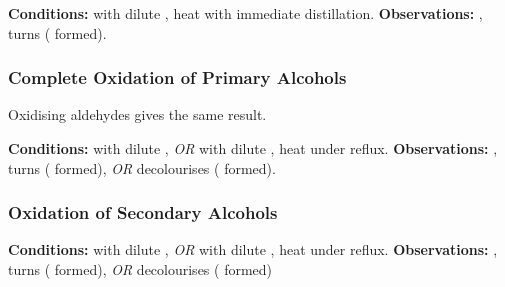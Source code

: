 				\vspace{1.5em}
				\vbox{\textbf{Conditions:}	\tabto{35mm} with dilute ,
											\tabto{35mm}heat with immediate distillation.}
				\vspace{0.75em}
				\vbox{\textbf{Observations:}\tabto{35mm} , turns 
														( formed).}




			\subsubsection{Complete Oxidation of Primary Alcohols}

				Oxidising aldehydes gives the same result.

				\vspace{1.5em}
				\vbox{\textbf{Conditions:}	\tabto{35mm} with dilute , \textit{OR}  with dilute ,
											\tabto{35mm}heat under reflux.}
				\vspace{0.75em}
				\vbox{\textbf{Observations:}\tabto{35mm} , turns 
														( formed), \textit{OR}
											\tabto{35mm}  decolourises ( formed).}




			\pagebreak
			\subsubsection{Oxidation of Secondary Alcohols}

				\vspace{1.5em}
				\vbox{\textbf{Conditions:}	\tabto{35mm} with dilute , \textit{OR}  with dilute ,
											\tabto{35mm}heat under reflux.}
				\vspace{0.75em}
				\vbox{\textbf{Observations:}\tabto{35mm} , turns 
														( formed), \textit{OR}
											\tabto{35mm}  decolourises ( formed)}

